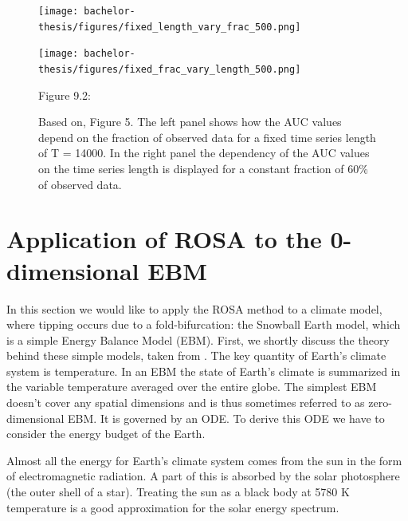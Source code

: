 \documentclass[%
thesis=student,%
coverpage=false,%
titlepage=false,%
headmarks=true, %
english,%
font=libertine, %
math=newpxtx, %
BCOR=5mm,%
coverBCOR=11mm%
]{tumbook}
\begin{document}
\begin{figure}[h!]
    \centering
    \begin{minipage}[t]{0.45\textwidth}
        \centering
        \texttt{[image: bachelor-thesis/figures/fixed\_length\_vary\_frac\_500.png]}
    \end{minipage}
    \hfill
    \begin{minipage}[t]{0.45\textwidth}
        \centering
        \texttt{[image: bachelor-thesis/figures/fixed\_frac\_vary\_length\_500.png]}
    \end{minipage}
    \vspace{0.5cm}
    
    \centering
    \begin{minipage}[b]{0.9\textwidth}
        \centering     
        Figure 9.2: 
    \end{minipage}
    \caption{Based on\cite{Morr:2024}, Figure 5. The left panel shows how the AUC values depend on the fraction of observed data for a fixed time series length of T = 14000. In the right panel the dependency of the AUC values on the time series length is displayed for a constant fraction of 60\% of observed data. }
    \label{fig:time_length_and_fraction_of_observed_data_dependence}
\end{figure}


\chapter{Application of ROSA to the 0-dimensional EBM}

In this section we would like to apply the ROSA method to a climate model, where tipping occurs due to a fold-bifurcation: the Snowball Earth model, which is a simple Energy Balance Model (EBM). First, we shortly discuss the theory behind these simple models, taken from \cite{Kaper:2013}. The key quantity of Earth's climate system is temperature. In an EBM the state of Earth's climate is summarized in the variable temperature averaged over the entire globe. The simplest EBM doesn't cover any spatial dimensions and is thus sometimes referred to as zero-dimensional EBM. It is governed by an ODE. To derive this ODE we have to consider the energy budget of the Earth.

Almost all the energy for Earth's climate system comes from the sun in the form of electromagnetic radiation. A part of this is absorbed by the solar photosphere (the outer shell of a star). Treating the sun as a black body at 5780 K temperature is a good approximation for the solar energy spectrum.
\end{document}
